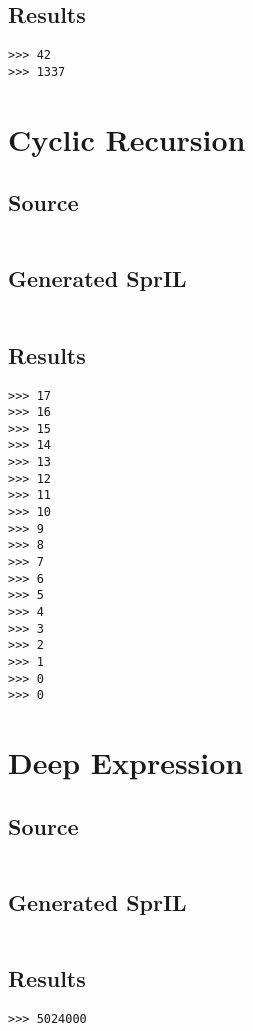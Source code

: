 \documentclass[twoside]{report}
\begin{document}
\subsection{Results}
\begin{verbatim}
>>> 42
>>> 1337
\end{verbatim}

\section{Cyclic Recursion}
\subsection{Source}
\inputminted[tabsize=4,linenos,firstnumber=1]{text}{../../src/haskell/PP-project-2016/test/cyclic_recursion.shl}
\subsection{Generated SprIL}
\inputminted[tabsize=4,linenos,firstnumber=0]{text}{../../src/haskell/PP-project-2016/test/cyclic_recursion_gen.txt}
\subsection{Results}
\begin{verbatim}
>>> 17
>>> 16
>>> 15
>>> 14
>>> 13
>>> 12
>>> 11
>>> 10
>>> 9
>>> 8
>>> 7
>>> 6
>>> 5
>>> 4
>>> 3
>>> 2
>>> 1
>>> 0
>>> 0
\end{verbatim}

\section{Deep Expression}
\subsection{Source}
\inputminted[tabsize=4,linenos,firstnumber=1]{text}{../../src/haskell/PP-project-2016/test/deep_expression.shl}
\subsection{Generated SprIL}
\inputminted[tabsize=4,linenos,firstnumber=0]{text}{../../src/haskell/PP-project-2016/test/deep_expression_gen.txt}
\subsection{Results}
\begin{verbatim}
>>> 5024000
\end{verbatim}
\end{document}
